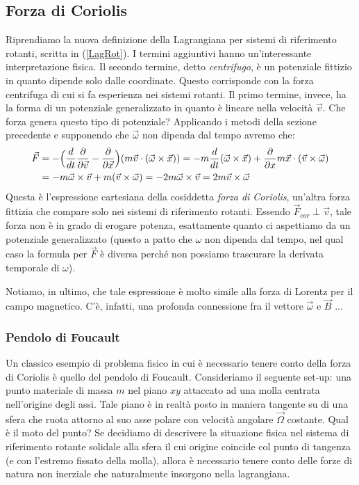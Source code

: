 \documentclass[a4paper,openany]{article}
\begin{document}
	\subsection{Forza di Coriolis}
	Riprendiamo la nuova definizione della Lagrangiana per sistemi di riferimento rotanti, scritta in (\ref{LagRot}). I termini aggiuntivi hanno un'interessante interpretazione fisica. Il secondo termine, detto \textit{centrifugo}, è un potenziale fittizio in quanto dipende solo dalle coordinate. Questo corrisponde con la forza centrifuga di cui si fa esperienza nei sistemi rotanti. Il primo termine, invece, ha la forma di un potenziale generalizzato in quanto è lineare nella velocità $\vec{v}$. Che forza genera questo tipo di potenziale? Applicando i metodi della sezione precedente e supponendo che $\vec{\omega}$ non dipenda dal tempo avremo che:
	\begin{equation}
		\begin{aligned}
			\vec{F} &= - \Bigl(\dfrac{d}{dt}\dfrac{\partial}{\partial \vec{v}} - \dfrac{\partial}{\partial \vec{x}}\Bigl) (m\vec{v}\cdot(\vec{\omega}\times\vec{x})) = - m\dfrac{d}{dt}(\vec{\omega}\times\vec{x}) +
			\dfrac{\partial }{\partial x} m\vec{x}\cdot(\vec{v}\times\vec{\omega})
			\\
			\vspace{2cm}
			&= - m\vec{\omega}\times\vec{v} + m(\vec{v}\times\vec{\omega}) = - 2m\vec{\omega}\times\vec{v} = 2m\vec{v}\times\vec{\omega} \\
		\end{aligned}
		\label{ForzaCoriolis}
	\end{equation}
	Questa è l'espressione cartesiana della cosiddetta \textit{forza di Coriolis}, un'altra forza fittizia che compare solo nei sistemi di riferimento rotanti.
	Essendo $\vec{F}_{cor} \perp \vec{v}$, tale forza non è in grado di erogare potenza, esattamente quanto ci aspettiamo da un potenziale generalizzato (questo a patto che $\omega$ non dipenda dal tempo, nel qual caso la formula per $\vec{F}$ è diversa perché non possiamo trascurare la derivata temporale di $\omega$).
	
	Notiamo, in ultimo, che tale espressione è molto simile alla forza di Lorentz per il campo magnetico. C'è, infatti, una profonda connessione fra il vettore $\vec{\omega}$ e $\vec{B}$ ...
	\subsubsection{Pendolo di Foucault}
	Un classico esempio di problema fisico in cui è necessario tenere conto della forza di Coriolis è quello del pendolo di Foucault. Consideriamo il seguente set-up: una punto materiale di massa $m$ nel piano $xy$ attaccato ad una molla centrata nell'origine degli assi. Tale piano è in realtà posto in maniera tangente su di una sfera che ruota attorno al suo asse polare con velocità angolare $\vec{\Omega}$ costante. Qual è il moto del punto? Se decidiamo di descrivere la situazione fisica nel sistema di riferimento rotante solidale alla sfera il cui origine coincide col punto di tangenza (e con l'estremo fissato della molla), allora è necessario tenere conto delle forze di natura non inerziale che naturalmente insorgono nella lagrangiana. 
	
\end{document}
